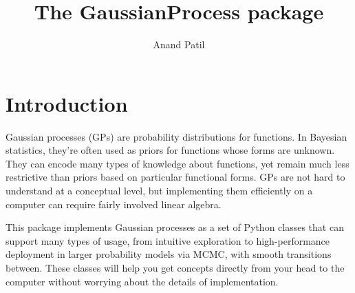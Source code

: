 \documentclass{manual}
\begin{document}
\title{The GaussianProcess package}
\author{Anand Patil}
\maketitle
\tableofcontents

\chapter{Introduction}\label{cha:introduction} %

Gaussian processes (GPs) are probability distributions for functions. In Bayesian statistics, they're often used as priors for functions whose forms are unknown. They can encode many types of knowledge about functions, yet remain much less restrictive than priors based on particular functional forms. GPs are not hard to understand at a conceptual level, but implementing them efficiently on a computer can require fairly involved linear algebra. 

This package implements Gaussian processes as a set of Python classes that can support many types of usage, from intuitive exploration to high-performance deployment in larger probability models via MCMC, with smooth transitions between. These classes will help you get concepts directly from your head to the computer without worrying about the details of implementation.
\end{document}
